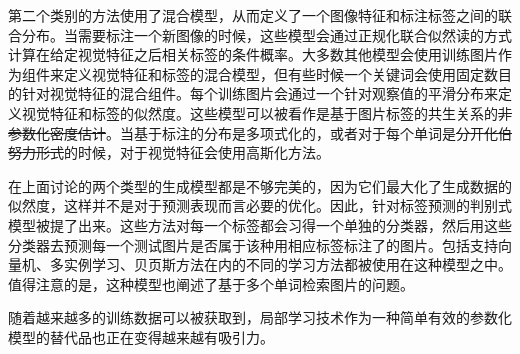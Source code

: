 \documentclass[a4paper,twocolumn]{ctexart}
\begin{document}
第二个类别的方法使用了混合模型，从而定义了一个图像特征和标注标签之间的联合分布。当需要标注一个新图像的时候，这些模型会通过正规化联合似然读的方式计算在给定视觉特征之后相关标签的条件概率。大多数其他模型会使用训练图片作为组件来定义视觉特征和标签的混合模型\cite{5,11,13}，但有些时候一个关键词会使用固定数目的针对视觉特征的混合组件\cite{2}。每个训练图片会通过一个针对观察值的平滑分布来定义视觉特征和标签的似然度。这些模型可以被看作是基于图片标签的共生关系的\sout{非参数化密度估计}。当基于标注的分布是多项式化的，或者对于每个单词是\sout{分开化伯努力形式}的时候，对于视觉特征会使用高斯化方法。

在上面讨论的两个类型的生成模型都是不够完美的，因为它们最大化了生成数据的似然度，这样并不是对于预测表现而言必要的优化。因此，针对标签预测的判别式模型被提了出来\cite{3,7,10}。这些方法对每一个标签都会习得一个单独的分类器，然后用这些分类器去预测每一个测试图片是否属于该种用相应标签标注了的图片。包括支持向量机、多实例学习、贝页斯方法在内的不同的学习方法都被使用在这种模型之中。值得注意的是，这种模型也阐述了基于多个单词检索图片的问题\cite{7}。

随着越来越多的训练数据可以被获取到，局部学习技术作为一种简单有效的参数化模型的替代品也正在变得越来越有吸引力。

\newpage
\end{document}
